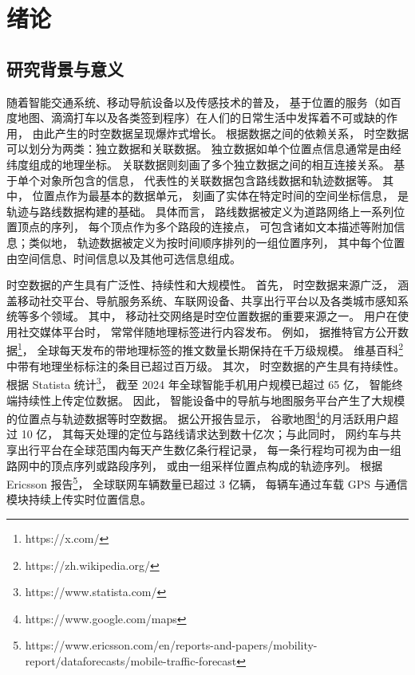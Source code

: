 \chapter{绪论}


\section{研究背景与意义}

随着智能交通系统、移动导航设备以及传感技术的普及， 基于位置的服务（如百度地图、滴滴打车以及各类签到程序）在人们的日常生活中发挥着不可或缺的作用， 由此产生的时空数据呈现爆炸式增长。 根据数据之间的依赖关系， 时空数据可以划分为两类：独立数据和关联数据。 独立数据如单个位置点信息通常是由经纬度组成的地理坐标。 关联数据则刻画了多个独立数据之间的相互连接关系。 基于单个对象所包含的信息， 代表性的关联数据包含路线数据和轨迹数据等。 其中， 位置点作为最基本的数据单元， 刻画了实体在特定时间的空间坐标信息， 是轨迹与路线数据构建的基础。 具体而言， 路线数据被定义为道路网络上一系列位置顶点的序列， 每个顶点作为多个路段的连接点， 可包含诸如文本描述等附加信息；类似地， 轨迹数据被定义为按时间顺序排列的一组位置序列， 其中每个位置由空间信息、时间信息以及其他可选信息组成。

时空数据的产生具有广泛性、持续性和大规模性。 首先， 时空数据来源广泛， 涵盖移动社交平台、导航服务系统、车联网设备、共享出行平台以及各类城市感知系统等多个领域。 其中， 移动社交网络是时空位置数据的重要来源之一。 用户在使用社交媒体平台时， 常常伴随地理标签进行内容发布。 例如， 据推特官方公开数据\footnote{https://x.com/}， 全球每天发布的带地理标签的推文数量长期保持在千万级规模。 维基百科\footnote{https://zh.wikipedia.org/}中带有地理坐标标注的条目已超过百万级。 其次， 时空数据的产生具有持续性。 根据 Statista 统计\footnote{https://www.statista.com/}， 截至 2024 年全球智能手机用户规模已超过 65 亿， 智能终端持续性上传定位数据。 因此， 智能设备中的导航与地图服务平台产生了大规模的位置点与轨迹数据等时空数据。 据公开报告显示， 谷歌地图\footnote{https://www.google.com/maps}的月活跃用户超过 10 亿， 其每天处理的定位与路线请求达到数十亿次；与此同时， 网约车与共享出行平台在全球范围内每天产生数亿条行程记录， 每一条行程均可视为由一组路网中的顶点序列或路段序列， 或由一组采样位置点构成的轨迹序列。 根据 Ericsson 报告\footnote{https://www.ericsson.com/en/reports-and-papers/mobility-report/dataforecasts/mobile-traffic-forecast}， 全球联网车辆数量已超过 3 亿辆， 每辆车通过车载 GPS 与通信模块持续上传实时位置信息。

